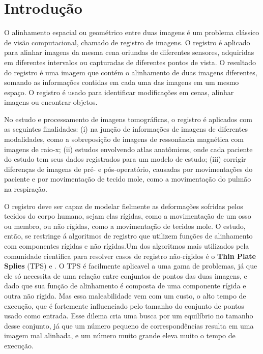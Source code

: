 \chapter{Introdução}
\label{cap:introducao}

  O alinhamento espacial ou geométrico entre duas imagens é um problema clássico
de visão computacional, chamado de registro de imagens. O registro é aplicado
para alinhar imagens da mesma cena oriundas de diferentes sensores, adquiridas
em diferentes intervalos ou capturadas de diferentes pontos de vista. O resultado
do registro é uma imagem que contém o alinhamento de duas imagens diferentes, somando
as informações contidas em cada uma das imagens em um mesmo espaço. O registro é
usado para identificar modificações em cenas, alinhar imagens ou encontrar objetos.

  No estudo e processamento de imagens tomográficas, o registro é aplicados
com as seguintes finalidades: (i) na junção de informações de imagens de 
diferentes modalidades, como a sobreposição de imagens de ressonância magnética 
com imagens de raio-x; (ii) estudos envolvendo atlas anatômicos, onde cada 
paciente do estudo tem seus dados registrados para um modelo de estudo; 
(iii) corrigir diferenças de imagens de pré- e pós-operatório, causadas 
por movimentações do paciente e por movimentação de tecido mole, como a 
movimentação do pulmão na respiração.

  O registro deve ser capaz de modelar fielmente as deformações sofridas
pelos tecidos do corpo humano, sejam elas rígidas, como a movimentação
de um osso ou membro, ou não rígidas, como a movimentação de tecidos mole.
O estudo, então, se restringe á algoritmos de registro que utilizem funções
de alinhamento com componentes rígidas e não rígidas.Um dos algoritmos mais utilizados 
pela comunidade cientifica para resolver casos de registro não-rígidos é 
o \textbf{Thin Plate Splies} (TPS) \cite{goshtasby1988registration} e 
\cite{bookstein1989principal}. O TPS é facilmente aplicavel a uma gama
de problemas, já que ele só necessita de uma relação entre conjuntos de pontos
das duas imagens, e dado que sua função de alinhamento é composta de 
uma componente rígida e outra não rígida. Mas essa maleabilidade vem com
um custo, o alto tempo de execução, que é fortemente influenciado pelo
tamanho do conjunto de pontos usado como entrada. Esse dilema cria uma
busca por um equilíbrio no tamanho desse conjunto, já que um número pequeno
de correspondências resulta em uma imagem mal alinhada, e um número muito
grande eleva muito o tempo de execução.

